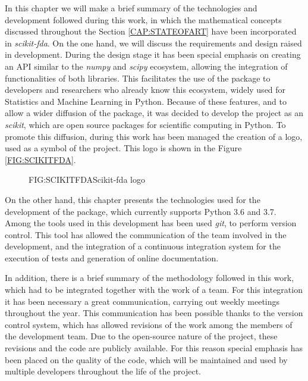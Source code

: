 
In this chapter we will make a brief summary of the technologies and development
followed during this work, in which the mathematical concepts discussed
throughout the Section \ref{CAP:STATEOFART} have been incorporated in
\textit{scikit-fda}. On the one hand, we will discuss the requirements and
design raised in development. During the design stage it has been special
emphasis on creating an \acs{API} similar to the \textit{numpy}\cite{numpy} and \textit{scipy}\cite{scipy} ecosystem, allowing
the integration of functionalities of both libraries. This facilitates the use
of the package to developers and researchers who already know this ecosystem,
widely used for Statistics and Machine Learning in Python. Because of these
features, and to allow a wider diffusion of the package, it was decided to
develop the project as an \textit{scikit}, which are open source packages for
scientific computing in Python.
To promote this diffusion, during this work has been managed the creation of a
logo, used as a symbol of the project. This logo is shown in the Figure
\ref{FIG:SCIKITFDA}.

\begin{figure}[Scikit-fda logo]{FIG:SCIKITFDA}{Scikit-fda logo}
\end{figure}

On the other hand, this chapter presents the technologies used for the development of
the package, which currently supports Python 3.6 and 3.7.
Among the tools used in this development has been used \textit{git},
to perform version control. This tool has allowed the communication of the team
involved in the development, and the integration of a continuous integration
system for the execution of tests and generation of online documentation.

In addition, there is a brief summary of the methodology followed in this work,
which had to be integrated together with the work of a team.
For this integration it has been necessary a great communication,
carrying out weekly meetings throughout the year. This communication has
been possible thanks to the version control system, which has allowed
revisions of the work among the members of the development team.
Due to the open-source nature of the project, these revisions and the code
are publicly available. For this reason special emphasis has been placed on
the quality of the code, which will be maintained and used by multiple
developers throughout the life of the project.
